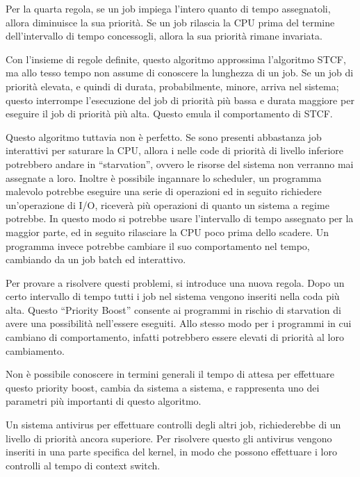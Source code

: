 \documentclass{article}
\numberwithin{equation}{subsection}
\begin{document}
Per la quarta regola, se un job impiega l'intero quanto di tempo assegnatoli, allora diminuisce la sua priorità. Se un job rilascia la CPU prima del termine dell'intervallo 
di tempo concessogli, allora la sua priorità rimane invariata. 


Con l'insieme di regole definite, questo algoritmo approssima l'algoritmo STCF, ma allo tesso tempo non assume di conoscere la lunghezza di un job. Se un job di priorità 
elevata, e quindi di durata, probabilmente, minore, arriva nel sistema; questo interrompe l'esecuzione del job di priorità più bassa e durata maggiore per eseguire il job 
di priorità più alta. Questo emula il comportamento di STCF. 

Questo algoritmo tuttavia non è perfetto. Se sono presenti abbastanza job interattivi per saturare la CPU, allora i nelle code di priorità di livello inferiore potrebbero 
andare in ``starvation'', ovvero le risorse del sistema non verranno mai assegnate a loro. 
Inoltre è possibile ingannare lo scheduler, un programma malevolo potrebbe eseguire una serie di operazioni ed in seguito richiedere un'operazione di I/O, riceverà 
più operazioni di quanto un sistema a regime potrebbe. In questo modo si potrebbe usare l'intervallo di tempo assegnato per la maggior parte, ed in seguito rilasciare 
la CPU poco prima dello scadere. 
Un programma invece potrebbe cambiare il suo comportamento nel tempo, cambiando da un job batch ed interattivo. 

Per provare a risolvere questi problemi, si introduce una nuova regola. Dopo un certo intervallo di tempo tutti i job nel sistema vengono inseriti nella coda più alta. 
Questo ``Priority Boost'' consente ai programmi in rischio di starvation di avere una possibilità nell'essere eseguiti. Allo stesso modo per i programmi in cui cambiano di 
comportamento, infatti potrebbero essere elevati di priorità al loro cambiamento. 

Non è possibile conoscere in termini generali il tempo di attesa per effettuare questo priority boost, cambia da sistema a sistema, e rappresenta uno dei parametri più 
importanti di questo algoritmo. 


Un sistema antivirus per effettuare controlli degli altri job, richiederebbe di un livello di priorità ancora superiore. Per risolvere questo gli antivirus vengono inseriti 
in una parte specifica del kernel, in modo che possono effettuare i loro controlli al tempo di context switch. 
\end{document}
